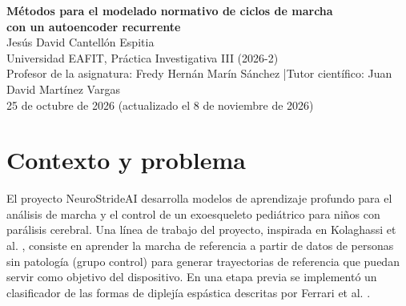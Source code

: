 \documentclass[11pt,a4paper]{article}
\begin{document}
\begin{center}
{\large\bfseries Métodos para el modelado normativo de ciclos de marcha\\ con un autoencoder recurrente}\\[8pt]
Jesús David Cantellón Espitia\\
{\small Universidad EAFIT, Práctica Investigativa III (2026-2)}\\
{\small Profesor de la asignatura: Fredy Hernán Marín Sánchez \quad|\quad Tutor científico: Juan David Martínez Vargas}\\
{\small 25 de octubre de 2026 (actualizado el 8 de noviembre de 2026)}
\end{center}

\begin{abstract}\noindent
Este informe describe los métodos de un estudio sobre un autoencoder recurrente (GRU) que modela ciclos completos de marcha de seis ángulos articulares remuestreados a 101 puntos. El trabajo se enmarca en el proyecto NeuroStrideAI (exoesqueleto pediátrico) y busca un modelo normativo que reconstruya ciclos con fidelidad, produzca ciclos periódicos y, en su variante denoising, corrija trayectorias atípicas. Se definen los objetivos y las hipótesis, se describen los datos y la partición por sujeto, los modelos de referencia, las dos modificaciones propuestas (código latente en cada paso del decodificador y pérdida de cierre del ciclo), el protocolo experimental con cinco semillas y prueba t pareada, y las métricas. Se incluye una matriz que relaciona cada objetivo con su hipótesis, método y criterio de decisión, el método del experimento con un codificador preentrenado (modelo fundacional de series de tiempo) y los controles usados para interpretarlo, y las suposiciones y limitaciones del diseño.
\end{abstract}


\section{Contexto y problema}

El proyecto NeuroStrideAI desarrolla modelos de aprendizaje profundo para el análisis de marcha y el control de un exoesqueleto pediátrico para niños con parálisis cerebral. Una línea de trabajo del proyecto, inspirada en Kolaghassi et al. \cite{kolaghassi2023}, consiste en aprender la marcha de referencia a partir de datos de personas sin patología (grupo control) para generar trayectorias de referencia que puedan servir como objetivo del dispositivo. En una etapa previa se implementó un clasificador de las formas de diplejía espástica descritas por Ferrari et al. \cite{ferrari2019}.
\end{document}
